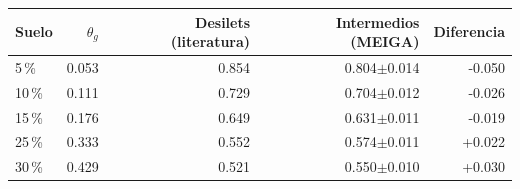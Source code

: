 \begin{tabular}{lrrrr}
\toprule
Suelo & $\theta_g$ & Desilets (literatura) & Intermedios (MEIGA) & Diferencia \\
\midrule
5\,\% & 0.053 & 0.854 & 0.804$\pm$0.014 & -0.050 \\
10\,\% & 0.111 & 0.729 & 0.704$\pm$0.012 & -0.026 \\
15\,\% & 0.176 & 0.649 & 0.631$\pm$0.011 & -0.019 \\
25\,\% & 0.333 & 0.552 & 0.574$\pm$0.011 & +0.022 \\
30\,\% & 0.429 & 0.521 & 0.550$\pm$0.010 & +0.030 \\
\bottomrule
\end{tabular}
